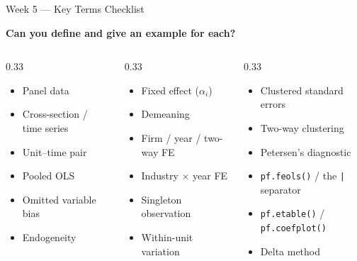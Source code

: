 \documentclass[9pt,aspectratio=169]{beamer}
\begin{document}
\begin{frame}{Week 5 --- Key Terms Checklist}

\textbf{Can you define and give an example for each?}

\medskip

\begin{columns}[T]
\begin{column}{0.33\textwidth}
\begin{itemize}
    \item Panel data
    \item Cross-section / time series
    \item Unit--time pair
    \item Pooled OLS
    \item Omitted variable bias
    \item Endogeneity
\end{itemize}
\end{column}
\begin{column}{0.33\textwidth}
\begin{itemize}
    \item Fixed effect ($\alpha_i$)
    \item Demeaning
    \item Firm / year / two-way FE
    \item Industry $\times$ year FE
    \item Singleton observation
    \item Within-unit variation
\end{itemize}
\end{column}
\begin{column}{0.33\textwidth}
\begin{itemize}
    \item Clustered standard errors
    \item Two-way clustering
    \item Petersen's diagnostic
    \item \texttt{pf.feols()} / the \texttt{|} separator
    \item \texttt{pf.etable()} / \texttt{pf.coefplot()}
    \item Delta method
\end{itemize}
\end{column}
\end{columns}

\end{frame}
\end{document}

